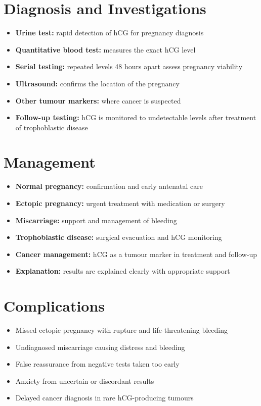 \section*{Diagnosis and Investigations}
\begin{itemize}
    \item \textbf{Urine test:} rapid detection of hCG for pregnancy diagnosis
    \item \textbf{Quantitative blood test:} measures the exact hCG level
    \item \textbf{Serial testing:} repeated levels 48 hours apart assess pregnancy viability
    \item \textbf{Ultrasound:} confirms the location of the pregnancy
    \item \textbf{Other tumour markers:} where cancer is suspected
    \item \textbf{Follow-up testing:} hCG is monitored to undetectable levels after treatment of trophoblastic disease
\end{itemize}

\section*{Management}
\begin{itemize}
    \item \textbf{Normal pregnancy:} confirmation and early antenatal care
    \item \textbf{Ectopic pregnancy:} urgent treatment with medication or surgery
    \item \textbf{Miscarriage:} support and management of bleeding
    \item \textbf{Trophoblastic disease:} surgical evacuation and hCG monitoring
    \item \textbf{Cancer management:} hCG as a tumour marker in treatment and follow-up
    \item \textbf{Explanation:} results are explained clearly with appropriate support
\end{itemize}

\section*{Complications}
\begin{itemize}
    \item Missed ectopic pregnancy with rupture and life-threatening bleeding
    \item Undiagnosed miscarriage causing distress and bleeding
    \item False reassurance from negative tests taken too early
    \item Anxiety from uncertain or discordant results
    \item Delayed cancer diagnosis in rare hCG-producing tumours
\end{itemize}

